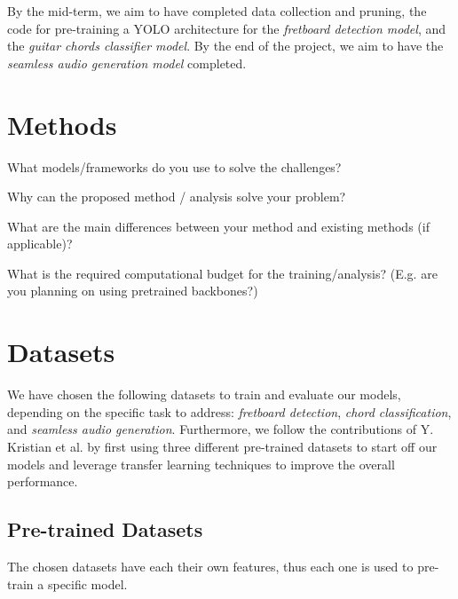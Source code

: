 \documentclass[10pt,twocolumn,letterpaper]{article}
\begin{document}
By the mid-term, we aim to have completed data collection and pruning, the code for pre-training a YOLO architecture for the \emph{fretboard detection model}, and the \emph{guitar chords classifier model}. By the end of the project, we aim to have the \emph{seamless audio generation model} completed.

\section{Methods}\label{sec:methods}

What models/frameworks do you use to solve the challenges?

Why can the proposed method / analysis solve your problem?

What are the main differences between your method and existing methods (if applicable)?

What is the required computational budget for the training/analysis? (E.g. are you planning on using pretrained backbones?)

\section{Datasets}\label{sec:datasets}

We have chosen the following datasets to train and evaluate our models, depending on the specific task to address: \emph{fretboard detection}, \emph{chord classification}, and \emph{seamless audio generation}. Furthermore, we follow the contributions of Y. Kristian et al. \cite{Kristian_Zaman_Tenoyo_Jodhinata_2024} by first using three different pre-trained datasets to start off our models and leverage transfer learning techniques to improve the overall performance.
\subsection{Pre-trained Datasets}
The chosen datasets have each their own features, thus each one is used to pre-train a specific model.
\end{document}
